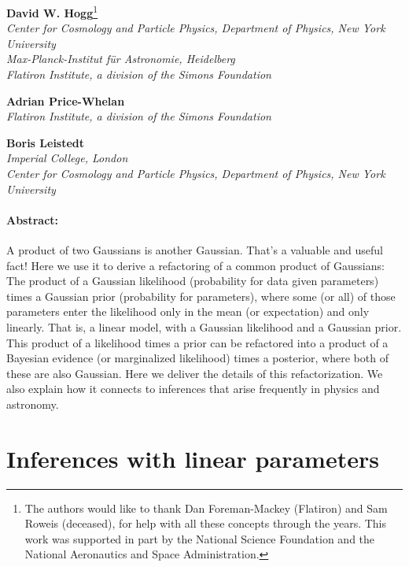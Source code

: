 \noindent\textbf{David W. Hogg}\footnote{%
The authors would like to thank
  Dan Foreman-Mackey (Flatiron) and
  Sam Roweis (deceased),
for help with all these concepts through the years.
This work was supported in part by the National Science Foundation
and the National Aeronautics and Space Administration.
}\\
{\footnotesize%
  \textsl{Center for Cosmology and Particle Physics, Department of Physics, New York University}\\
  \textsl{Max-Planck-Institut f\"ur Astronomie, Heidelberg}\\
  \textsl{Flatiron Institute, a division of the Simons Foundation}%
}

\medskip\noindent\textbf{Adrian Price-Whelan}\\
{\footnotesize%
  \textsl{Flatiron Institute, a division of the Simons Foundation}%
}

\medskip\noindent\textbf{Boris Leistedt}\\
{\footnotesize%
  \textsl{Imperial College, London}\\
  \textsl{Center for Cosmology and Particle Physics, Department of Physics, New York University}%
}

\paragraph{Abstract:}
A product of two Gaussians is another Gaussian.
That's a valuable and useful fact!
Here we use it to derive a refactoring of a common product of
Gaussians:
The product of a Gaussian likelihood (probability for data given
parameters) times a Gaussian prior (probability for parameters),
where some (or all) of those parameters enter the likelihood
only in the mean (or expectation) and only linearly.
That is, a linear model, with a Gaussian likelihood and a Gaussian
prior.
This product of a likelihood times a prior can be refactored into a
product of a Bayesian evidence (or marginalized likelihood)
times a posterior, where both of these are also Gaussian.
Here we deliver the details of this refactorization.
We also explain how it connects to inferences that arise frequently in
physics and astronomy.

\section{Inferences with linear parameters}

